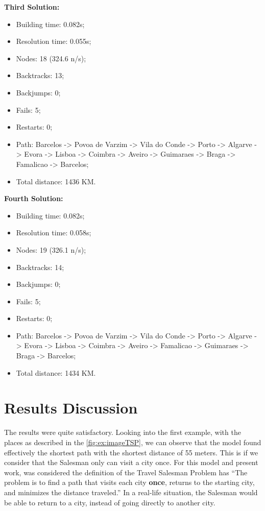 \documentclass[runningheads,a4paper,english]{llncs}[2022/01/12]
\begin{document}
\textbf{Third Solution:}
\begin{itemize}
  \item Building time: 0.082s;
  \item Resolution time: 0.055s;
  \item Nodes: 18 (324.6 n/s);
  \item Backtracks: 13;
  \item Backjumps: 0;
  \item Fails: 5;
  \item Restarts: 0;
  \item Path: Barcelos -> Povoa de Varzim -> Vila do Conde -> Porto -> Algarve -> Evora -> Lisboa -> Coimbra -> Aveiro -> Guimaraes -> Braga -> Famalicao -> Barcelos;
  \item Total distance: 1436 KM.
\end{itemize}

\newpage
\textbf{Fourth Solution:}
\begin{itemize}
  \item Building time: 0.082s;
  \item Resolution time: 0.058s;
  \item Nodes: 19 (326.1 n/s);
  \item Backtracks: 14;
  \item Backjumps: 0;
  \item Fails: 5;
  \item Restarts: 0;
  \item Path: Barcelos -> Povoa de Varzim -> Vila do Conde -> Porto -> Algarve -> Evora -> Lisboa -> Coimbra -> Aveiro -> Famalicao -> Guimaraes -> Braga -> Barcelos;
  \item Total distance: 1434 KM.
\end{itemize}

\newpage
\section{Results Discussion}
\label{sec:ResultsDiscussion}
The results were quite satisfactory. Looking into the first example, with the places as described in the \ref{fig:ex:imageTSP}, we can observe that the model found effectively the shortest path with the shortest distance of 55 meters. This is if we consider that the Salesman only can visit a city once. For this model and present work, was considered the definition of the Travel Salesman Problem has ``The problem is to find a path that visits each city \textbf{once}, returns to the starting city, and minimizes the distance traveled.'' \cite{BritannicaTSP} \newline
In a real-life situation, the Salesman would be able to return to a city, instead of going directly to another city. \newline
\end{document}
